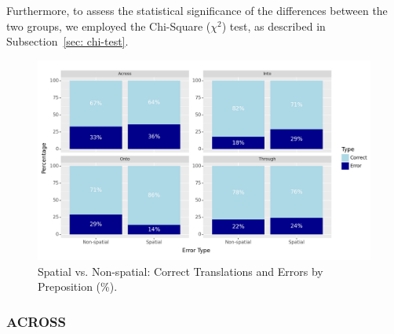 Furthermore, to assess the statistical significance of the differences between the two groups, we employed the Chi-Square ($\chi^2$) test, as described in Subsection~\ref{sec: chi-test}. 


\begin{figure}[htb]
        \centering
        \includegraphics[width=1\textwidth]{textual/Figuras/Results/Unknown-52.png}
        \caption{Spatial vs. Non-spatial: Correct Translations and Errors by Preposition (\%).}
        \label{fig: spatial-non-perc}
\end{figure}


\subsubsection{ACROSS} 

